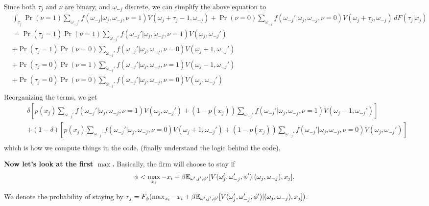 \documentclass[12pt]{article}[margin=1in]
\begin{document}
Since both $\tau_j$ and $\nu$ are binary, and $\omega_{-j}$ discrete, we can simplify the above equation to
\begin{equation*}
    \begin{split}
        &\int_{\tau_j}\Pr(\nu=1)\sum_{\omega_{-j}'}f(\omega_{-j}|\omega_j,\omega_{-j},\nu=1)
        V(\omega_j+\tau_j-1, \omega_{-j})+\Pr(\nu=0)\sum_{\omega_{-j}}f(\omega_{-j}'|\omega_j,\omega_{-j},\nu=0)
        V(\omega_j+\tau_j, \omega_{-j}) \, dF(\tau_j|x_j)\\
        &=\Pr(\tau_j=1)\Pr(\nu=1)\sum_{\omega_{-j}'}f(\omega_{-j}'|\omega_j,\omega_{-j},\nu=1)V(\omega_j, \omega_{-j}')\\
        &+\Pr(\tau_j=1)\Pr(\nu=0)\sum_{\omega_{-j}'}f(\omega_{-j}'|\omega_j,\omega_{-j},\nu=0)V(\omega_j+1, \omega_{-j}')\\
        &+\Pr(\tau_j=0)\Pr(\nu=1)\sum_{\omega_{-j}'}f(\omega_{-j}'|\omega_j,\omega_{-j},\nu=1)V(\omega_j-1, \omega_{-j}')\\
        &+\Pr(\tau_j=0)\Pr(\nu=0)\sum_{\omega_{-j}'}f(\omega_{-j}'|\omega_j,\omega_{-j},\nu=0)V(\omega_j, \omega_{-j}')\\
    \end{split}
\end{equation*}
Reorganizing the terms, we get
\begin{equation}\label{eq:calcval}
    \begin{split}
        &\delta \left[p(x_j)\sum_{\omega_{-j}'}f(\omega_{-j}'|\omega_j,\omega_{-j},\nu=1)V(\omega_j, \omega_{-j}')+(1-p(x_j))\sum_{\omega_{-j}'}f(\omega_{-j}'|\omega_j,\omega_{-j},\nu=1)V(\omega_j-1, \omega_{-j}')\right]\\
        &+(1-\delta) \left[p(x_j)\sum_{\omega_{-j}'}f(\omega_{-j}'|\omega_j,\omega_{-j},\nu=0)V(\omega_j+1, \omega_{-j}')+(1-p(x_j))\sum_{\omega_{-j}'}f(\omega_{-j}'|\omega_j,\omega_{-j},\nu=0)V(\omega_j, \omega_{-j}')\right]\\
    \end{split}
\end{equation}
which is how we compute things in the code. (finally understand the logic behind the code).

\textbf{Now let's look at the first $\max$.}
Basically, the firm will choose to stay if 
$$\phi<\max_{x_i}-x_i+\beta\mathbb{E}_{\omega',j',\phi'}[V(\omega_j',\omega_{-j}',\phi')|(\omega_j, \omega_{-j}),x_j].$$

We denote the probability of staying by $r_j = F_\phi(\max_{x_i}-x_i+\beta\mathbb{E}_{\omega',j',\phi'}[V(\omega_j',\omega_{-j}',\phi')|(\omega_j, \omega_{-j}),x_j])$.
\end{document}
